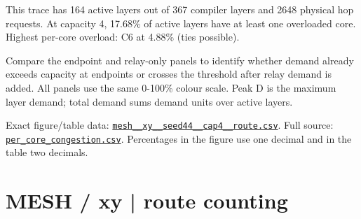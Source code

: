 \documentclass[10pt,a4paper]{article}
\begin{document}
This trace has 164 active layers out of 367 compiler layers and 2648 physical hop requests. At capacity 4, 17.68\% of active layers have at least one overloaded core. Highest per-core overload: C6 at 4.88\% (ties possible).\par
Compare the endpoint and relay-only panels to identify whether demand already exceeds capacity at endpoints or crosses the threshold after relay demand is added. All panels use the same 0-100\% colour scale. Peak D is the maximum layer demand; total demand sums demand units over active layers.\par
Exact figure/table data: \href{\detokenize{file:///home/dhruv-pansuriya/Documents/BTP/Compiler-Driven-ACE/output/pdf/qaoa_methods_congestion/tables/mesh__xy__seed44__cap4__route.csv}}{\nolinkurl{mesh__xy__seed44__cap4__route.csv}}. Full source: \href{\detokenize{file:///home/dhruv-pansuriya/Documents/BTP/Compiler-Driven-ACE/results/qaoa_2seed_2026-10-26/congestion/per_core_congestion.csv}}{\nolinkurl{per_core_congestion.csv}}. Percentages in the figure use one decimal and in the table two decimals.\par
\clearpage
\section*{MESH / xy | route counting}
\end{document}
